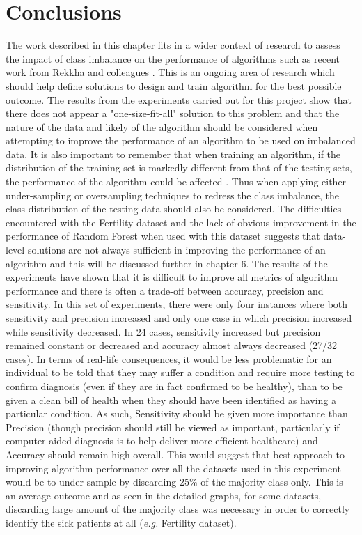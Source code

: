 \section{Conclusions}
The work described in this chapter fits in a wider context of research to assess the impact of class imbalance on the performance of algorithms such as recent work from Rekkha and colleagues \citep{Rekha:2019uu}. This is an ongoing area of research which should help define solutions to design and train algorithm for the best possible outcome.\newline
The results from the experiments carried out for this project show that there does not appear a "one-size-fit-all" solution to this problem and that the nature of the data and likely of the algorithm should be considered when attempting to improve the performance of an algorithm to be used on imbalanced data.\newline
It is also important to remember that when training an algorithm, if the distribution of the training set is markedly different from that of the testing sets, the performance of the algorithm could be affected \citep{Ling:2017jm}. Thus when applying either under-sampling or oversampling techniques to redress the class imbalance, the class distribution of the testing data should also be considered.\newline
The difficulties encountered with the Fertility dataset and the lack of obvious improvement in the performance of Random Forest when used with this dataset suggests that data-level solutions are not always sufficient in improving the performance of an algorithm and this will be discussed further in chapter 6.
The results of the experiments have shown that it is difficult to improve all metrics of algorithm performance and there is often a trade-off between accuracy, precision and sensitivity. In this set of experiments, there were only four  instances where both sensitivity and precision increased and only one case in which precision increased while sensitivity decreased. In 24 cases, sensitivity increased but precision remained constant or decreased and accuracy almost always decreased (27/32 cases).
In terms of real-life consequences, it would be less problematic for an individual to be told that they may suffer a condition and require more testing to confirm diagnosis (even if they are in fact confirmed to be healthy), than to be given a clean bill of health when they should have been identified as having a particular condition. As such, Sensitivity should be given more importance than Precision (though precision should still be viewed as important, particularly if computer-aided diagnosis is to help deliver more efficient healthcare) and Accuracy should remain high overall. This would suggest that best approach to improving algorithm performance over all the datasets used in this experiment would be to under-sample by discarding 25\% of the majority class only. This is an average outcome and as seen in the detailed graphs, for some datasets, discarding large amount of the majority class was necessary in order to correctly identify the sick patients at all (\textit{e.g.} Fertility dataset). \newline
